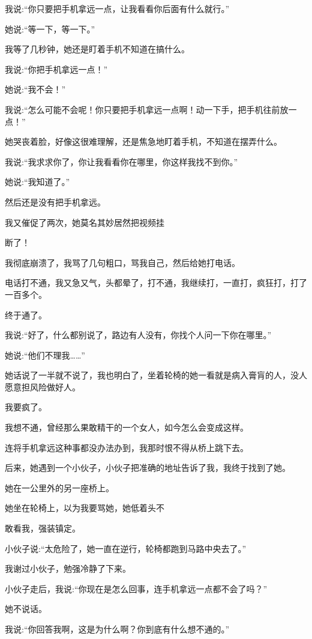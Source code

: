 \documentclass{article}
\begin{document}
我说:“你只要把手机拿远一点，让我看看你后面有什么就行。”

她说:“等一下，等一下。”

我等了几秒钟，她还是盯着手机不知道在搞什么。

我说:“你把手机拿远一点！”

她说:“我不会！”

我说:“怎么可能不会呢！你只要把手机拿远一点啊！动一下手，把手机往前放一点！”

她哭丧着脸，好像这很难理解，还是焦急地盯着手机，不知道在摆弄什么。

我说:“我求求你了，你让我看看你在哪里，你这样我找不到你。”

她说:“我知道了。”

然后还是没有把手机拿远。

我又催促了两次，她莫名其妙居然把视频挂

\newpage 

断了！

我彻底崩溃了，我骂了几句粗口，骂我自己，然后给她打电话。

电话打不通，我又急又气，头都晕了，打不通，我继续打，一直打，疯狂打，打了一百多个。

终于通了。

我说:“好了，什么都别说了，路边有人没有，你找个人问一下你在哪里。”

她说:“他们不理我……”

她话说了一半就不说了，我也明白了，坐着轮椅的她一看就是病入膏肓的人，没人愿意担风险做好人。

我要疯了。

我想不通，曾经那么果敢精干的一个女人，如今怎么会变成这样。

连将手机拿远这种事都没办法办到，我那时恨不得从桥上跳下去。

后来，她遇到一个小伙子，小伙子把准确的地址告诉了我，我终于找到了她。

她在一公里外的另一座桥上。

她坐在轮椅上，以为我要骂她，她低着头不

\newpage 

敢看我，强装镇定。

小伙子说:“太危险了，她一直在逆行，轮椅都跑到马路中央去了。”

我谢过小伙子，勉强冷静了下来。

小伙子走后，我说:“你现在是怎么回事，连手机拿远一点都不会了吗？”

她不说话。

我说:“你回答我啊，这是为什么啊？你到底有什么想不通的。”
\end{document}
